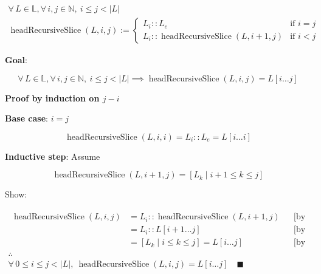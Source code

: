 \begin{gather*}
\forall\, L \in \mathbb{L}, \forall\, i, j \in \mathbb{N},\ i \leq j < |L| \\
\operatorname{headRecursiveSlice}(L, i, j) :=
\begin{cases}
L_i :: L_e & \text{if } i = j \\
L_i :: \operatorname{headRecursiveSlice}(L, i + 1, j) & \text{if } i < j
\end{cases}
\end{gather*}

\textbf{Goal}:\par\nopagebreak

\begin{equation*}
\forall\, L \in \mathbb{L}, \forall\, i, j \in \mathbb{N},\ i \leq j < |L| \implies \operatorname{headRecursiveSlice}(L, i, j) = L[i \dots j]
\end{equation*}

\textbf{Proof by induction on $j - i$}\par\nopagebreak

\textbf{Base case}: $i = j$\par\nopagebreak

\begin{equation*}
\operatorname{headRecursiveSlice}(L, i, i) = L_i :: L_e = L[i \dots i]
\end{equation*}

\textbf{Inductive step}: Assume\par\nopagebreak

\begin{equation*}
\operatorname{headRecursiveSlice}(L, i + 1, j) = [ L_k \mid i + 1 \leq k \leq j ]
\end{equation*}

Show:\par\nopagebreak

\begin{gather*}
\begin{aligned}
\operatorname{headRecursiveSlice}(L, i, j) &= L_i :: \operatorname{headRecursiveSlice}(L, i + 1, j) && \text{[by definition]} \\
&= L_i :: L[i + 1 \dots j] && \text{[by Inductive Hypothesis]} \\
&= [ L_k \mid i \leq k \leq j ] = L[i \dots j] && \text{[by specification]}
\end{aligned} \\
\therefore \\
\forall\, 0 \leq i \leq j < |L|,\ \operatorname{headRecursiveSlice}(L, i, j) = L[i \dots j]
\quad \blacksquare
\end{gather*}


